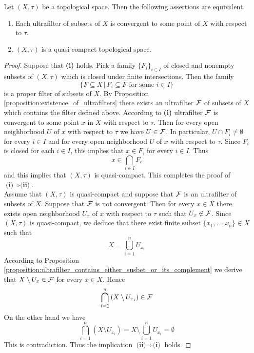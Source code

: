 \begin{theorem}\label{theorem:quasi_compact_in_terms_of_ultrafilters}
Let $(X,\tau)$ be a topological space. Then the following assertions are equivalent.
\begin{enumerate}[label=\emph{\textbf{(\roman*)}}, leftmargin=*]
\item Each ultrafilter of subsets of $X$ is convergent to some point of $X$ with respect to $\tau$.
\item $(X,\tau)$ is a quasi-compact topological space.
\end{enumerate}
\end{theorem}
\begin{proof}
Suppose that \textbf{(i)} holds. Pick a family $\{F_i\}_{i\in I}$ of closed and nonempty subsets of $\left(X,\tau\right)$ which is closed under finite intersections. Then the family
$$\big\{F\subseteq X\,\big|\,F_i\subseteq F\mbox{ for some }i\in I\big\}$$
is a proper filter of subsets of $X$. By Proposition \ref{proposition:existence_of_ultrafilters} there exists an ultrafilter ${\mathcal F}$ of subsets of $X$ which contains the filter defined above. According to \textbf{(i)} ultrafilter ${\mathcal F}$ is convergent to some point $x$ in $X$ with respect to $\tau$. Then for every open neighborhood $U$ of $x$ with respect to $\tau$ we have $U \in {\mathcal F}$. In particular, $U\cap F_i \neq \emptyset$ for every $i\in I$ and for every open neighborhood $U$ of $x$ with respect to $\tau$. Since $F_i$ is closed for each $i\in I$, this implies that $x \in F_i$ for every $i \in I$. Thus
$$x \in  \bigcap_{i\in I}F_i$$
and this implies that $\left(X,\tau\right)$ is quasi-compact. This completes the proof of $\textbf{(i)}\Rightarrow \textbf{(ii)}$.\\
Assume that $(X,\tau)$ is quasi-compact and suppose that ${\mathcal F}$ is an ultrafilter of subsets of $X$. Suppose that ${\mathcal F}$ is not convergent. Then for every $x \in X$ there exists open neighborhood $U_x$ of $x$ with respect to $\tau$ such that $U_x \not \in {\mathcal F}$. Since $\left(X,\tau\right)$ is quasi-compact, we deduce that there exist finite subset $\{x_1,...,x_n\} \in X$ such that 
$$X = \bigcup_{i=1}^nU_{x_i}$$
According to Proposition \ref{proposition:ultrafilter_contains_either_susbet_or_its_complement} we derive that $X\setminus U_x \in {\mathcal F}$ for every $x \in X$. Hence
$$\bigcap_{i=1}^n\left(X\setminus U_{x_i}\right) \in {\mathcal F}$$
On the other hand we have
$$\bigcap_{i=1}^n\left(X\setminus U_{x_i}\right) = X \setminus \bigcup_{i=1}^nU_{x_i} = \emptyset$$
This is contradiction. Thus the implication $\textbf{(ii)}\Rightarrow \textbf{(i)}$ holds.
\end{proof}

